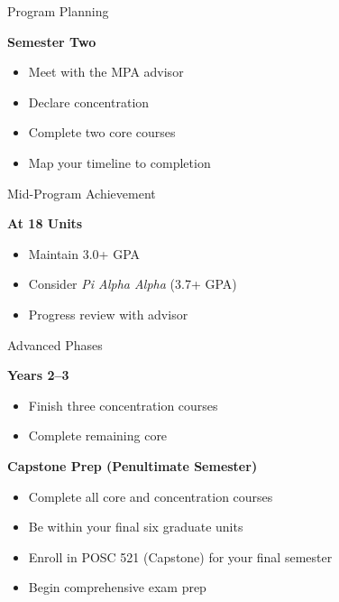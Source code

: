 \documentclass[10pt,aspectratio=169]{beamer}
\begin{document}
\begin{frame}{Program Planning}
\begin{Large}
\textbf{Semester Two}
\begin{itemize}
  \item Meet with the MPA advisor
  \item Declare concentration
  \item Complete two core courses
  \item Map your timeline to completion
\end{itemize}
\end{Large}
\end{frame}

\begin{frame}{Mid-Program Achievement}
\begin{Large}
\textbf{At 18 Units}
\begin{itemize}
  \item Maintain 3.0+ GPA
  \item Consider \emph{Pi Alpha Alpha} (3.7+ GPA)
  \item Progress review with advisor
\end{itemize}
\end{Large}
\end{frame}

\begin{frame}{Advanced Phases}
\begin{large}
\textbf{Years 2--3}
\begin{itemize}
  \item Finish three concentration courses
  \item Complete remaining core
\end{itemize}
\textbf{Capstone Prep (Penultimate Semester)}
\begin{itemize}
  \item Complete all core and concentration courses
  \item Be within your final six graduate units
  \item Enroll in POSC 521 (Capstone) for your final semester
  \item Begin comprehensive exam prep
\end{itemize}
\end{large}
\end{frame}
\end{document}
